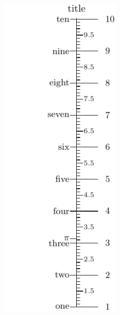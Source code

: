\documentclass[a4paper,11pt,english]{sphinxmanual}
\begin{document}
\includegraphics{ex_axes_7.pdf}
\end{document}
